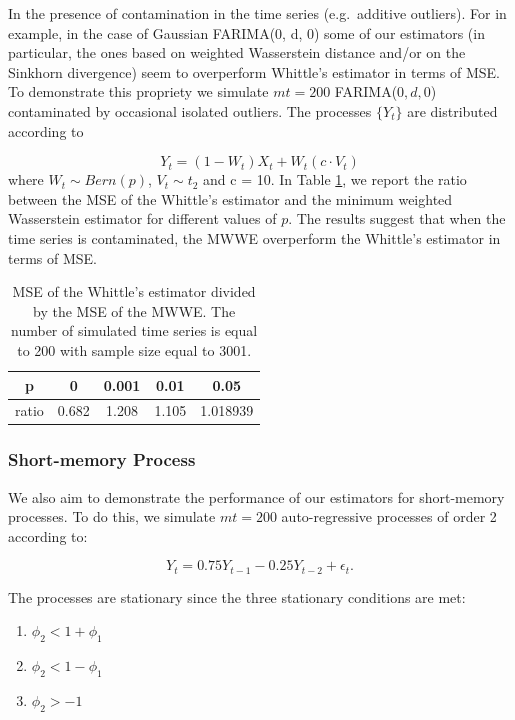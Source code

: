 \documentclass[
  11pt,
]{article}
\providecommand{\tightlist}{%
  \setlength{\itemsep}{0pt}\setlength{\parskip}{0pt}}
\begin{document}
\hfill\break

In the presence of contamination in the time series (e.g.~additive
outliers). For in example, in the case of Gaussian FARIMA(0, d, 0) some
of our estimators (in particular, the ones based on weighted Wasserstein
distance and/or on the Sinkhorn divergence) seem to overperform
Whittle's estimator in terms of MSE. To demonstrate this propriety we
simulate \(mt = 200\) FARIMA(\(0,d,0\)) contaminated by occasional
isolated outliers. The processes \(\{Y_t\}\) are distributed according
to

\[Y_{t}=\left(1-W_{t}\right) X_{t}+W_{t}\left(c \cdot V_{t}\right)\]
where \(W_t \sim Bern(p)\), \(V_t \sim t_2\) and c = 10. In Table
\ref{tab:outliers}, we report the ratio between the MSE of the Whittle's
estimator and the minimum weighted Wasserstein estimator for different
values of \(p\). The results suggest that when the time series is
contaminated, the MWWE overperform the Whittle's estimator in terms of
MSE.

\begin{table}[h]
\centering
\begin{tabular}{|c|c|c|c|c|}
\hline
p  &  0  & 0.001   & 0.01    & 0.05 \\
\hline
ratio  & 0.682 & 1.208 & 1.105 & 1.018939 \\
\hline
\end{tabular}
\caption{MSE of the Whittle's estimator divided by the MSE of the MWWE. The number of simulated time series is equal to 200 with sample size equal to 3001.}
\label{tab:outliers}
\end{table}

\hypertarget{short-memory-process}{%
\subsubsection{Short-memory Process}\label{short-memory-process}}

We also aim to demonstrate the performance of our estimators for
short-memory processes. To do this, we simulate \(mt = 200\)
auto-regressive processes of order 2 according to:

\[Y_t = 0.75 Y_{t-1} - 0.25Y_{t-2} + \epsilon_t.\]

The processes are stationary since the three stationary conditions are
met:

\begin{enumerate}
\def\labelenumi{\arabic{enumi}.}
\tightlist
\item
  \(\phi_{2}<1+\phi_{1}\)
\item
  \(\phi_{2}<1-\phi_{1}\)
\item
  \(\phi_{2}>-1\)
\end{enumerate}
\end{document}
